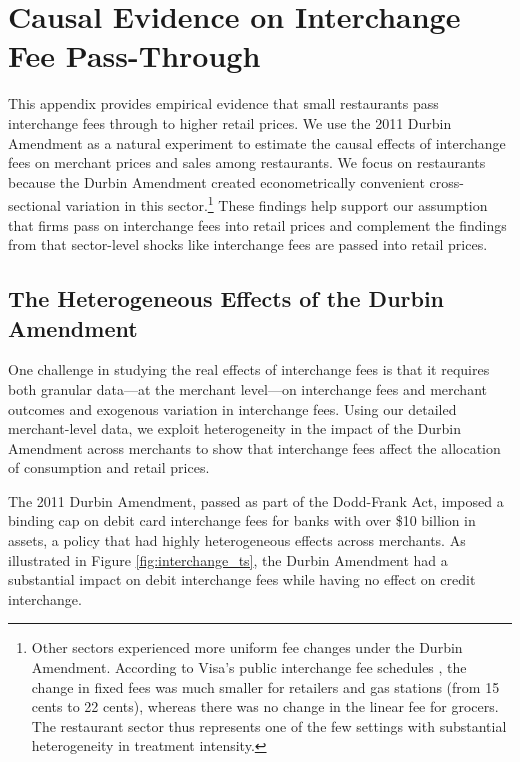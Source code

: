 \documentclass[main.tex]{subfiles}
\begin{document}
\section{Causal Evidence on Interchange Fee Pass-Through\label{sec:appendix_durbin}}

This appendix provides empirical evidence that small restaurants pass interchange fees through to higher retail prices.
We use the 2011 Durbin Amendment as a natural experiment to estimate the causal effects of interchange fees on merchant prices and sales among restaurants.
We focus on restaurants because the Durbin Amendment created econometrically convenient cross-sectional variation in this sector.\footnote{ Other sectors experienced more uniform fee changes under the Durbin Amendment.
According to Visa's public interchange fee schedules \citep{Visa2010}, the change in fixed fees was much smaller for retailers and gas stations (from 15 cents to 22 cents), whereas there was no change in the linear fee for grocers.
The restaurant sector thus represents one of the few settings with substantial heterogeneity in treatment intensity. } These findings help support our assumption that firms pass on interchange fees into retail prices and complement the findings from \citet{Amiti.etal2019} that sector-level shocks like interchange fees are passed into retail prices.

\subsection{The Heterogeneous Effects of the Durbin Amendment}

One challenge in studying the real effects of interchange fees is that it requires both granular data---at the merchant level---on interchange fees and merchant outcomes and exogenous variation in interchange fees.
Using our detailed merchant-level data, we exploit heterogeneity in the impact of the Durbin Amendment across merchants to show that interchange fees affect the allocation of consumption and retail prices.

The 2011 Durbin Amendment, passed as part of the Dodd-Frank Act, imposed a binding cap on debit card interchange fees for banks with over \$10 billion in assets, a policy that had highly heterogeneous effects across merchants.
As illustrated in Figure \ref{fig:interchange_ts}, the Durbin Amendment had a substantial impact on debit interchange fees while having no effect on credit interchange.
\end{document}

